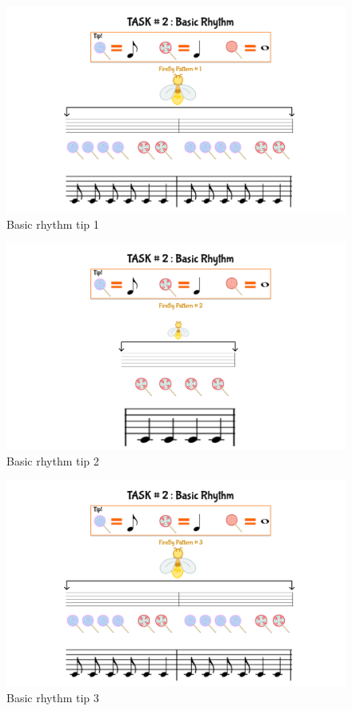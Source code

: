 \begin{figure}[H]
    \centering
    \includegraphics[width=12cm]{figures/NewFigures/BasicRhythmTip1.png}
    \caption{Basic rhythm tip 1}
    \label{fig:BasicRhythmTip1}
\end{figure}

\begin{figure}[H]
    \centering
    \includegraphics[width=15cm]{figures/NewFigures/BasicRhythmTip2.png}
    \caption{Basic rhythm tip 2}
    \label{fig:BasicRhythmTip2}
\end{figure}

\begin{figure}[H]
    \centering
    \includegraphics[width=15cm]{figures/NewFigures/BasicRhythmTip3.png}
    \caption{Basic rhythm tip 3}
    \label{fig:BasicRhythmTip3}
\end{figure}

